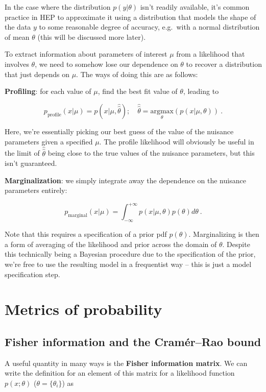 \documentclass[
  11pt,
  numbers=noendperiod]{book}
\begin{document}
In the case where the distribution \(p(y|\theta)\) isn't readily
available, it's common practice in HEP to approximate it using a
distribution that models the shape of the data \(y\) to some reasonable
degree of accuracy, e.g.~with a normal distribution of mean \(\theta\)
(this will be discussed more later).

To extract information about parameters of interest \(\mu\) from a
likelihood that involves \(\theta\), we need to somehow lose our
dependence on \(\theta\) to recover a distribution that just depends on
\(\mu\). The ways of doing this are as follows:

\textbf{Profiling}: for each value of \(\mu\), find the best fit value
of \(\theta\), leading to

\[ p_{\mathrm{profile}}(x|\mu) = p(x | \mu, \hat{\hat{\theta}});\quad\hat{\hat{\theta}}=\underset{\theta}{\mathrm{argmax}}(p(x|\mu,\theta))~.\]

Here, we're essentially picking our best guess of the value of the
nuisance parameters given a specified \(\mu\). The profile likelihood
will obviously be useful in the limit of \(\hat{\hat{\theta}}\) being
close to the true values of the nuisance parameters, but this isn't
guaranteed.

\textbf{Marginalization}: we simply integrate away the dependence on the
nuisance parameters entirely:

\[p_{\mathrm{marginal}}(x|\mu) = \int_{-\infty}^{+\infty} p(x| \mu, \theta) p(\theta) d\theta ~.\]

Note that this requires a specification of a prior pdf \(p(\theta)\).
Marginalizing is then a form of averaging of the likelihood and prior
across the domain of \(\theta\). Despite this technically being a
Bayesian procedure due to the specification of the prior, we're free to
use the resulting model in a frequentist way -- this is just a model
specification step.

\hypertarget{metrics-of-probability}{%
\section{Metrics of probability}\label{metrics-of-probability}}

\hypertarget{sec-fisher}{%
\subsection{Fisher information and the Cramér--Rao
bound}\label{sec-fisher}}

A useful quantity in many ways is the \textbf{Fisher information
matrix}. We can write the definition for an element of this matrix for a
likelihood function \(p(x ; \theta)\) (\(\theta = \{\theta_i\}\)) as
\end{document}
